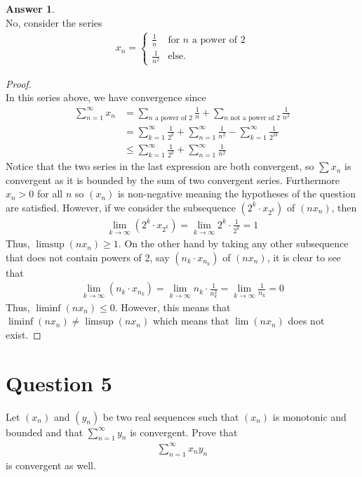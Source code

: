 \documentclass[10pt,a4paper]{article}
\theoremstyle{definition}
\newtheorem*{answer*}{Answer}
\theoremstyle{definition}
\begin{document}
\begin{answer*}$ $
\\No, consider the series
\begin{align*}
x_n = \begin{cases}
\frac{1}{n} &\text{for $n$ a power of 2}\\
\frac{1}{n^2} &\text{else.}
\end{cases}
\end{align*}
\end{answer*}

\begin{proof}$ $
\\In this series above, we have convergence since 
\begin{align*}
\sum_{n = 1}^\infty x_n &= \sum_{n \text{ a power of 2}} \frac{1}{n} + \sum_{n \text{ not a power of 2}} \frac{1}{n^2}\\
&= \sum_{k = 1}^\infty \frac{1}{2^k} + \sum_{n = 1}^\infty \frac{1}{n^2} - \sum_{k = 1}^\infty \frac{1}{2^{2k}}\\
&\leq \sum_{k = 1}^\infty \frac{1}{2^k} + \sum_{n = 1}^\infty \frac{1}{n^2}
\end{align*}
Notice that the two series in the last expression are both convergent, so $\sum x_n$ is convergent as it is bounded by the sum of two convergent series. Furthermore $x_n > 0$ for all $n$ so $(x_n)$ is non-negative meaning the hypotheses of the question are satisfied. However, if we consider the subsequence $(2^k \cdot x_{2^k})$ of $(nx_n)$, then 
\begin{align*}
\lim_{k \to \infty} (2^k \cdot x_{2^k}) = \lim_{k \to \infty} 2^k \cdot \frac{1}{2^k} = 1
\end{align*}
Thus, $\limsup(nx_n) \geq 1$. On the other hand by taking any other subsequence that does not contain powers of 2, say $(n_k \cdot x_{n_k})$ of $(nx_n)$, it is clear to see that
\begin{align*}
\lim_{k \to \infty} (n_k \cdot x_{n_k}) = \lim_{k \to \infty} n_k \cdot \frac{1}{n_k^2} = \lim_{k \to \infty} \frac{1}{n_k} = 0
\end{align*}
Thus, $\liminf(nx_n) \leq 0$. However, this means that $\liminf(nx_n) \neq \limsup(nx_n)$ which means that $\lim(nx_n)$ does not exist. 
\end{proof}

\section*{Question 5}
Let $(x_n)$ and $(y_n)$ be two real sequences such that $(x_n)$ is monotonic and bounded and that $\sum_{n = 1}^\infty y_n$ is convergent. Prove that 
\begin{align*}
\sum_{n = 1}^\infty x_n y_n 
\end{align*}
is convergent as well. 
\end{document}
